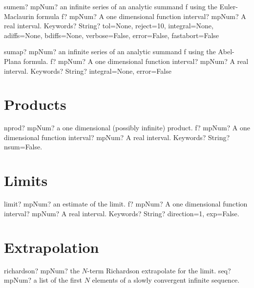 \documentclass[12pt,a4paper,openany]{book}
\begin{document}
\begin{mpFunctionsExtract}
\mpFunctionThree
{sumem? mpNum? an infinite series of an analytic summand f using the Euler-Maclaurin formula}
{f? mpNum? A one dimensional function}
{interval? mpNum? A real interval.}
{Keywords? String?  tol=None, reject=10, integral=None, adiffs=None, bdiffs=None, verbose=False, error=False, fastabort=False}
\end{mpFunctionsExtract}

\begin{mpFunctionsExtract}
\mpFunctionThree
{sumap? mpNum? an infinite series of an analytic summand f using the Abel-Plana formula.}
{f? mpNum? A one dimensional function}
{interval? mpNum? A real interval.}
{Keywords? String?  integral=None, error=False}
\end{mpFunctionsExtract}

\section{Products}

\begin{mpFunctionsExtract}
\mpFunctionThree
{nprod? mpNum? a one dimensional (possibly infinite) product.}
{f? mpNum? A one dimensional function}
{interval? mpNum? A real interval.}
{Keywords? String? nsum=False.}
\end{mpFunctionsExtract}

\section{Limits}

\begin{mpFunctionsExtract}
\mpFunctionThree
{limit? mpNum? an estimate of the limit.}
{f? mpNum? A one dimensional function}
{interval? mpNum? A real interval.}
{Keywords? String? direction=1, exp=False.}
\end{mpFunctionsExtract}

\section{Extrapolation}

\begin{mpFunctionsExtract}
\mpFunctionOne
{richardson? mpNum? the $N$-term Richardson extrapolate for the limit.}
{seq? mpNum? a list of the first $N$ elements of a slowly convergent infinite sequence.}
\end{mpFunctionsExtract}
\end{document}
